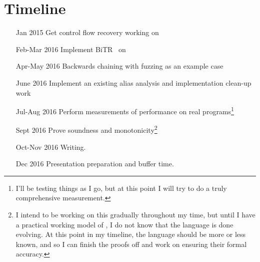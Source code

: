 \section{Timeline}
\begin{itemize}
  \item[Jan 2015] Get control flow recovery working on \sysname
  \item[Feb-Mar 2016] Implement BiTR~\cite{bitr} on \sysname
  \item[Apr-May 2016] Backwards chaining with fuzzing as an example case
  \item[June 2016] Implement an existing alias analysis and implementation clean-up work
  \item[Jul-Aug 2016] Perform measurements of performance on real programs\footnote{
      I'll be testing things as I go, but at this point I will try to do a truly comprehensive measurement.
    }
  \item[Sept 2016] Prove soundness and monotonicity\footnote{
      I intend to be working on this gradually throughout my time, but until I have a practical working model of \sysname, I do not know that the language is done evolving.
      At this point in my timeline, the language should be more or less known, and so I can finish the proofs off and work on ensuring their formal accuracy.
    }
  \item[Oct-Nov 2016] Writing.
  \item[Dec 2016] Presentation preparation and buffer time.
\end{itemize}
